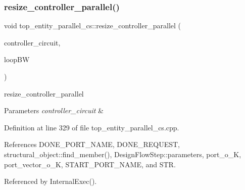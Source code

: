 \subsubsection{\texorpdfstring{resize\+\_\+controller\+\_\+parallel()}{resize\_controller\_parallel()}}
{\footnotesize\ttfamily void top\+\_\+entity\+\_\+parallel\+\_\+cs\+::resize\+\_\+controller\+\_\+parallel (\begin{DoxyParamCaption}\item[{\hyperlink{structural__objects_8hpp_a8ea5f8cc50ab8f4c31e2751074ff60b2}{structural\+\_\+object\+Ref}}]{controller\+\_\+circuit,  }\item[{unsigned}]{loop\+BW }\end{DoxyParamCaption})\hspace{0.3cm}{\ttfamily [protected]}}



resize\+\_\+controller\+\_\+parallel 


\begin{DoxyParams}{Parameters}
{\em controller\+\_\+circuit} & \\
\hline
\end{DoxyParams}


Definition at line 329 of file top\+\_\+entity\+\_\+parallel\+\_\+cs.\+cpp.



References D\+O\+N\+E\+\_\+\+P\+O\+R\+T\+\_\+\+N\+A\+ME, D\+O\+N\+E\+\_\+\+R\+E\+Q\+U\+E\+ST, structural\+\_\+object\+::find\+\_\+member(), Design\+Flow\+Step\+::parameters, port\+\_\+o\+\_\+K, port\+\_\+vector\+\_\+o\+\_\+K, S\+T\+A\+R\+T\+\_\+\+P\+O\+R\+T\+\_\+\+N\+A\+ME, and S\+TR.



Referenced by Internal\+Exec().

